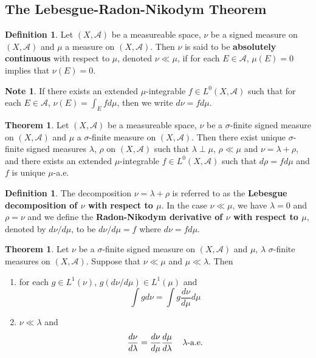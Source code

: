 \documentclass[12pt]{amsart}
\theoremstyle{definition}
\newtheorem{defn}[definition]{Definition}
\newtheorem{note}[definition]{Note}
\newtheorem{thm}[definition]{Theorem}
\newcommand{\lam}{\lambda}
\newcommand{\sig}{\sigma}
\newcommand{\MA}{\mathcal{A}}
\newcommand{\ld}[1]{\label{defn:#1}}
\begin{document}
	
	
	
	
	
	
	
	
	
	
	
	
	
	
	\newpage
	\subsection{The Lebesgue-Radon-Nikodym Theorem}
	
	\begin{defn} \ld{00000} 
		Let $(X, \MA)$ be a measureable space, $\nu$ be a signed measure on $(X, \MA)$ and $\mu$ a measure on $(X,\MA)$. Then $\nu$ is said to be \textbf{absolutely continuous} with respect to $\mu$, denoted $\nu \ll \mu$, if for each $E \in \MA$, $\mu(E) = 0$ implies that $\nu(E) =0$. 
	\end{defn}
	
	\begin{note}
		If there exists an extended $\mu$-integrable $f \in L^0(X, \MA)$ such that for each $E \in \MA$, $\nu(E) = \int_E f d\mu$, then we write $d\nu = f d\mu$.
	\end{note}
	
	\begin{thm}
		Let $(X, \MA)$ be a measureable space, $\nu$ be a $\sig$-finite signed measure on $(X, \MA)$ and $\mu$ a $\sig$-finite measure on $(X,\MA)$. Then there exist unique $\sig$-finite signed measures $\lam$, $\rho$ on $(X, \MA)$ such that $\lam \perp \mu$, $\rho \ll \mu$ and $\nu = \lam + \rho$, and there exists an extended $\mu$-integrable $f \in L^0(X, \MA)$ such that $d\rho = f d \mu$ and $f$ is unique $\mu$-a.e.  
	\end{thm}
	
	\begin{defn} \ld{00000} 
		The decomposition $\nu = \lam + \rho$ is referred to as the \textbf{Lebesgue decomposition of $\nu$ with respect to $\mu$}. In the case $\nu \ll \mu$, we have $\lam = 0$ and $\rho = \nu$ and we define the \textbf{Radon-Nikodym derivative of $\nu$ with respect to $\mu$}, denoted by $d\nu/d\mu$, to be $d\nu/d\mu = f$ where $d\nu = fd\mu$.   
	\end{defn}
	
	\begin{thm}
		Let $\nu$ be a $\sig$-finite signed measure on $(X, \MA)$ and $\mu$, $\lam$ $\sig$-finite measures on $(X,\MA)$. Suppose that $\nu \ll \mu$ and $\mu \ll \lam$. Then 
		\begin{enumerate}
			\item for each $g \in L^1(\nu)$, $g(d\nu/d\mu) \in  L^1(\mu)$ and $$\int g d\nu = \int g \frac{d\nu}{d\mu} d\mu$$
			\item $\nu \ll \lam$ and $$\frac{d \nu}{d\lam} = \frac{d \nu}{d\mu} \frac{d\mu}{d\lam} \hspace{4mm} \lam \text{-a.e.}$$
		\end{enumerate}
	\end{thm}
	
\end{document}
